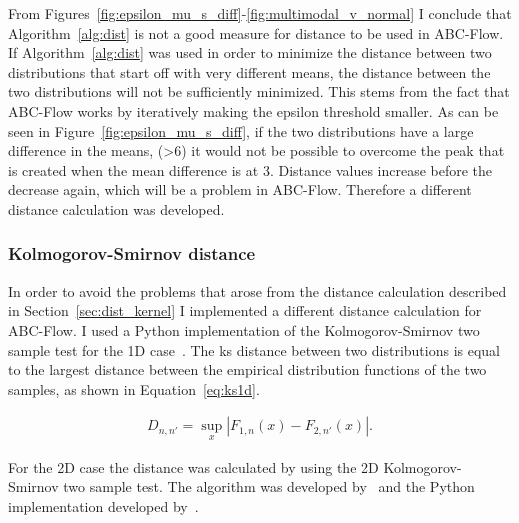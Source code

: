 From Figures~\ref{fig:epsilon_mu_s_diff}-\ref{fig:multimodal_v_normal} I conclude that Algorithm~\ref{alg:dist} is not a good measure for distance to be used in ABC-Flow. If Algorithm~\ref{alg:dist} was used in order to minimize the distance between two distributions that start off with very different means, the distance between the two distributions will not be sufficiently minimized. This stems from the fact that ABC-Flow works by iteratively making the epsilon threshold smaller. As can be seen in Figure~\ref{fig:epsilon_mu_s_diff}, if the two distributions have a large difference in the means, (>6) it would not be possible to overcome the peak that is created when the mean difference is at 3. Distance values increase before the decrease again, which will be a problem in ABC-Flow. Therefore a different distance calculation was developed.   
\subsubsection{Kolmogorov-Smirnov distance}
\label{sec:dist_ks}

In order to avoid the problems that arose from the distance calculation described in Section~\ref{sec:dist_kernel} I implemented a different distance calculation for ABC-Flow. I used a Python implementation of the Kolmogorov-Smirnov two sample test for the 1D case~\autocite{Kolmogorov:1933}. The \acrshort{ks} distance between two distributions is equal to the largest distance between the empirical distribution functions of the two samples, as shown in Equation~\ref{eq:ks1d}.%

\begin{align}
\label{eq:ks1d}
D_{n,n'}=\sup _{x}|F_{1,n}(x)-F_{2,n'}(x)|.
\end{align}

\noindent For the 2D case the distance was calculated by using the 2D Kolmogorov-Smirnov two sample test. The algorithm was developed by~\textcite{Fasano:1987hg} and the Python implementation developed by~\textcite{Syrtis2016}. 

